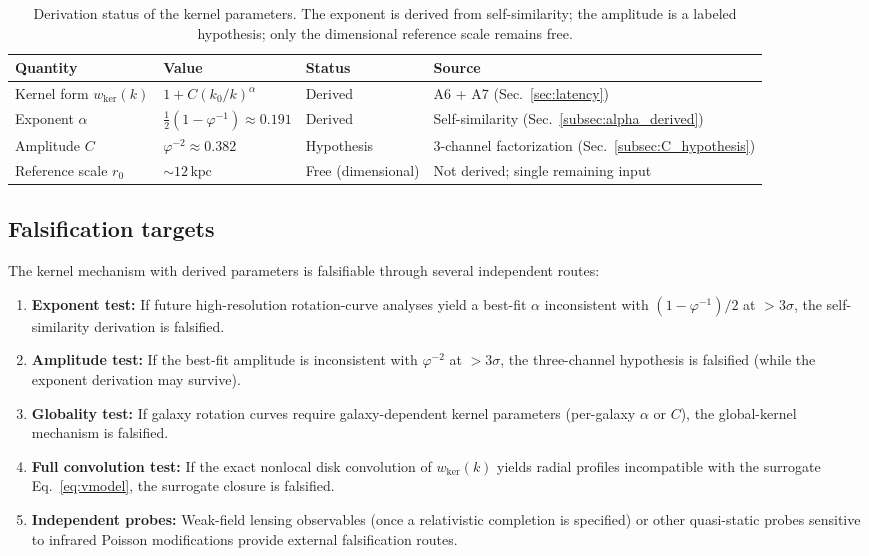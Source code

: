 \documentclass[entropy,article,submit,pdftex,moreauthors]{Definitions/mdpi}
\begin{document}
\begin{table}[htbp]
\centering
\footnotesize
\setlength{\tabcolsep}{4pt}
\renewcommand{\arraystretch}{1.15}
\begin{tabular}{llll}
\toprule
\textbf{Quantity} & \textbf{Value} & \textbf{Status} & \textbf{Source} \\
\midrule
Kernel form \(w_{\mathrm{ker}}(k)\) & \(1+C(k_0/k)^\alpha\) & Derived & A6 + A7 (Sec.~\ref{sec:latency}) \\
Exponent \(\alpha\) & \(\tfrac{1}{2}(1-\varphi^{-1})\approx 0.191\) & Derived & Self-similarity (Sec.~\ref{subsec:alpha_derived}) \\
Amplitude \(C\) & \(\varphi^{-2}\approx 0.382\) & Hypothesis & 3-channel factorization (Sec.~\ref{subsec:C_hypothesis}) \\
Reference scale \(r_0\) & \(\sim 12\,\mathrm{kpc}\) & Free (dimensional) & Not derived; single remaining input \\
\bottomrule
\end{tabular}
\caption{Derivation status of the kernel parameters. The exponent is derived from self-similarity; the amplitude is a labeled hypothesis; only the dimensional reference scale remains free.}
\label{tab:derivation_status}
\end{table}

\subsection{Falsification targets}
\label{subsec:falsifiers}

The kernel mechanism with derived parameters is falsifiable through several independent routes:
\begin{enumerate}[label=(\roman*)]
  \item \textbf{Exponent test:} If future high-resolution rotation-curve analyses yield a best-fit \(\alpha\) inconsistent with \((1-\varphi^{-1})/2\) at \(>3\sigma\), the self-similarity derivation is falsified.
  \item \textbf{Amplitude test:} If the best-fit amplitude is inconsistent with \(\varphi^{-2}\) at \(>3\sigma\), the three-channel hypothesis is falsified (while the exponent derivation may survive).
  \item \textbf{Globality test:} If galaxy rotation curves require galaxy-dependent kernel parameters (per-galaxy \(\alpha\) or \(C\)), the global-kernel mechanism is falsified.
  \item \textbf{Full convolution test:} If the exact nonlocal disk convolution of \(w_{\mathrm{ker}}(k)\) yields radial profiles incompatible with the surrogate Eq.~\eqref{eq:vmodel}, the surrogate closure is falsified.
  \item \textbf{Independent probes:} Weak-field lensing observables (once a relativistic completion is specified) or other quasi-static probes sensitive to infrared Poisson modifications provide external falsification routes.
\end{enumerate}
\end{document}
